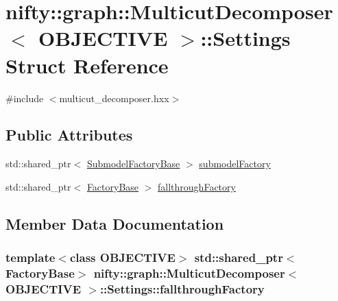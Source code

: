 \hypertarget{structnifty_1_1graph_1_1MulticutDecomposer_1_1Settings}{}\section{nifty\+:\+:graph\+:\+:Multicut\+Decomposer$<$ O\+B\+J\+E\+C\+T\+I\+V\+E $>$\+:\+:Settings Struct Reference}
\label{structnifty_1_1graph_1_1MulticutDecomposer_1_1Settings}


{\ttfamily \#include $<$multicut\+\_\+decomposer.\+hxx$>$}

\subsection*{Public Attributes}
\begin{DoxyCompactItemize}
\item 
std\+::shared\+\_\+ptr$<$ \hyperlink{classnifty_1_1graph_1_1MulticutDecomposer_a94775bf93c00b927a43cab26e6edbcae}{Submodel\+Factory\+Base} $>$ \hyperlink{structnifty_1_1graph_1_1MulticutDecomposer_1_1Settings_ad50184eb9b4e9059afa29fca25572ad4}{submodel\+Factory}
\item 
std\+::shared\+\_\+ptr$<$ \hyperlink{classnifty_1_1graph_1_1MulticutDecomposer_a170cc710edca2926ff121b591105a835}{Factory\+Base} $>$ \hyperlink{structnifty_1_1graph_1_1MulticutDecomposer_1_1Settings_a64ed17fe8ea8ffa47d1a70855b6efc32}{fallthrough\+Factory}
\end{DoxyCompactItemize}


\subsection{Member Data Documentation}
\hypertarget{structnifty_1_1graph_1_1MulticutDecomposer_1_1Settings_a64ed17fe8ea8ffa47d1a70855b6efc32}{}
\subsubsection[{fallthrough\+Factory}]{\setlength{\rightskip}{0pt plus 5cm}template$<$class O\+B\+J\+E\+C\+T\+I\+V\+E$>$ std\+::shared\+\_\+ptr$<${\bf Factory\+Base}$>$ {\bf nifty\+::graph\+::\+Multicut\+Decomposer}$<$ O\+B\+J\+E\+C\+T\+I\+V\+E $>$\+::Settings\+::fallthrough\+Factory}\label{structnifty_1_1graph_1_1MulticutDecomposer_1_1Settings_a64ed17fe8ea8ffa47d1a70855b6efc32}
\hypertarget{structnifty_1_1graph_1_1MulticutDecomposer_1_1Settings_ad50184eb9b4e9059afa29fca25572ad4}{}
